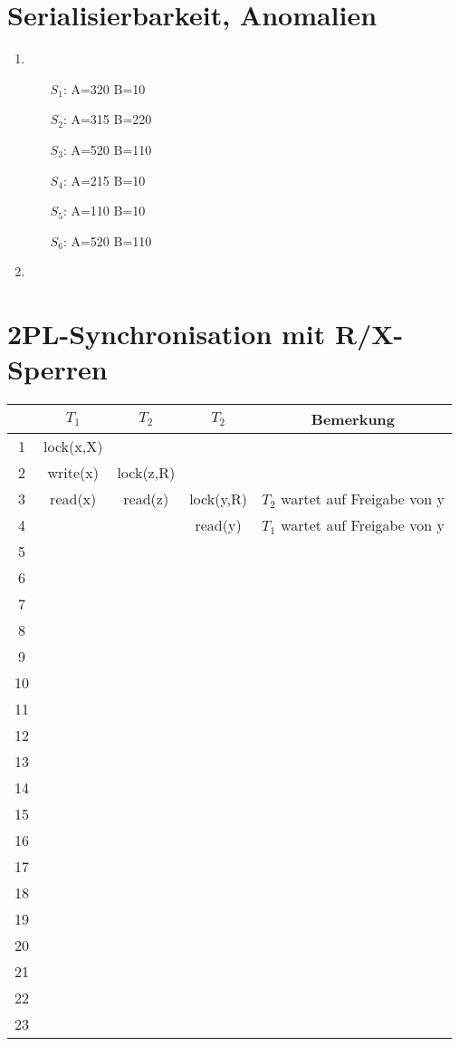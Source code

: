 \documentclass[ngerman]{gdb-aufgabenblatt}
\begin{document}
\section{Serialisierbarkeit, Anomalien}
\begin{enumerate}
\item 
\begin{enumerate}
\item[$S_1$:]A=320 B=10
\item[$S_2$:]A=315 B=220
\item[$S_3$:]A=520 B=110
\item[$S_4$:]A=215 B=10
\item[$S_5$:]A=110 B=10
\item[$S_6$:]A=520 B=110
\end{enumerate}
\item
\begin{enumerate}

\end{enumerate}
\end{enumerate}

\section{2PL-Synchronisation mit R/X-Sperren}
 \begin{tabular}{|c|c|c|c||c|}
 \hline
    & $T_1$ & $T_2$ & $T_2$ & Bemerkung \\ \hline 
	1 & lock(x,X) &  &  &   \\
    2 & write(x) & lock(z,R) &  &   \\
    3 & read(x) & read(z) & lock(y,R) & $T_2$ wartet auf Freigabe von y \\
    4 &  &  & read(y) & $T_1$ wartet auf Freigabe von y  \\
    5 &  &  &  &   \\
    6 &  &  &  &   \\
    7 &  &  &  &   \\
    8 &  &  &  &   \\
    9 &  &  &  &   \\
    10 &  &  &  &   \\
    11 &  &  &  &   \\
    12 &  &  &  &   \\
    13 &  &  &  &   \\
    14 &  &  &  &   \\
    15 &  &  &  &   \\
    16 &  &  &  &   \\
    17 &  &  &  &   \\
    18 &  &  &  &   \\
    19 &  &  &  &   \\
    20 &  &  &  &   \\
    21 &  &  &  &   \\
    22 &  &  &  &   \\
    23 &  &  &  &   \\ \hline
 \end{tabular}
\end{document}
